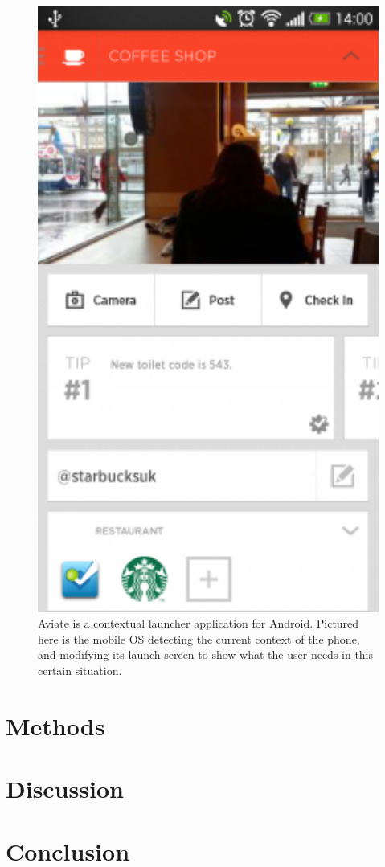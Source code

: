 \documentclass[11pt]{article}
\begin{document}
\begin{figure}[h]
\begin{center}
\includegraphics[width=5in]{aviate}
\caption{Aviate is a contextual launcher application for Android. Pictured here is the mobile OS detecting the current context of the phone, and modifying its launch screen to show what the user needs in this certain situation. \cite{Aviate}}
\label{aviate}
\end{center}
\end{figure}


\section{Methods}
\section{Discussion}
\section{Conclusion}



\end{document}
